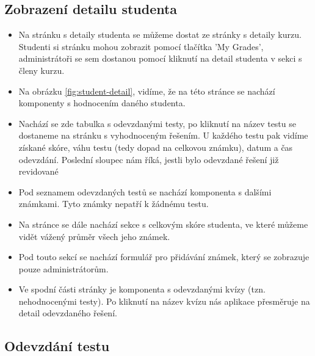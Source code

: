 \subsection{Zobrazení detailu studenta}

\begin{itemize}
	\item Na stránku s detaily studenta se můžeme dostat ze stránky s detaily kurzu. Studenti si stránku mohou zobrazit pomocí tlačítka 'My Grades', administrátoři se sem dostanou pomocí kliknutí na detail studenta v sekci s členy kurzu.
	\item Na obrázku \ref{fig:student-detail}, vidíme, že na této stránce se nachází komponenty s hodnocením daného studenta. 
	\item Nachází se zde tabulka s odevzdanými testy, po kliknutí na název testu se dostaneme na stránku s vyhodnoceným řešením. U každého testu pak vidíme získané skóre, váhu testu (tedy dopad na celkovou známku), datum a čas odevzdání. Poslední sloupec nám říká, jestli bylo odevzdané řešení již revidované
	\item Pod seznamem odevzdaných testů se nachází komponenta s dalšími známkami. Tyto známky nepatří k žádnému testu. 
	\item Na stránce se dále nachází sekce s celkovým skóre studenta, ve které můžeme vidět vážený průměr všech jeho známek.
	\item Pod touto sekcí se nachází formulář pro přidávání známek, který se zobrazuje pouze administrátorům.
	\item Ve spodní části stránky je komponenta s odevzdanými kvízy (tzn. nehodnocenými testy). Po kliknutí na název kvízu nás aplikace přesměruje na detail odevzdaného řešení.
\end{itemize}

\subsection{Odevzdání testu}

